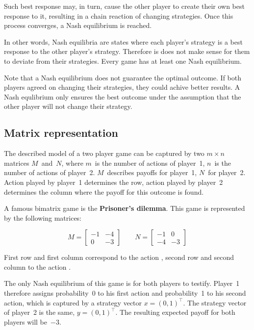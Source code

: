 \documentclass[a4paper,11pt]{article}
\begin{document}
Such best response may, in turn, cause the other player to create their own best response to it, resulting in a chain reaction of changing strategies. Once this process converges, a Nash equilibrium is reached.

In other words, Nash equilibria are states where each player's strategy is a best response to the other player's strategy. Therefore is does not make sense for them to deviate from their strategies. Every game has at least one Nash equilibrium.

Note that a Nash equilibrium does not guarantee the optimal outcome. If both players agreed on changing their strategies, they could achive better results. A Nash equlibrium only ensures the best outcome under the assumption that the other player will not change their strategy.

\subsection{Matrix representation}

The described model of a two player game can be captured by two $m \times n$ matrices $M$~and~$N$, where $m$~is the number of actions of player~1, $n$~is the number of actions of player~2. $M$~describes payoffs for player~1, $N$~for player~2. Action played by player~1 determines the row, action played by player~2 determines the column where the payoff for this outcome is found.

A famous bimatrix game is the \textbf{Prisoner's dilemma}. This game is represented by the following matrices:

$$M = \begin{bmatrix}
	-1 & -4 \\
	0 & -3
\end{bmatrix} \qquad
N = \begin{bmatrix}
	-1 & 0 \\
	-4 & -3
\end{bmatrix}$$

First row and first column correspond to the action , second row and second column to the action .

The only Nash equilibrium of this game is for both players to testify. Player~1 therefore assigns probability~0 to his first action and probability~1 to his second action, which is captured by a strategy vector $x = (0, 1)^{\top}$. The strategy vector of player~2 is the same, $y = (0, 1)^{\top}$. The resulting expected payoff for both players will be~$-3$.
\end{document}
